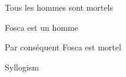 %	
%	

\epigraph{
	Tous les hommes sont mortels
	
	Fosca est un homme
	
	Par conséquent Fosca est mortel\footnotemark
}{
	Syllogism
}
